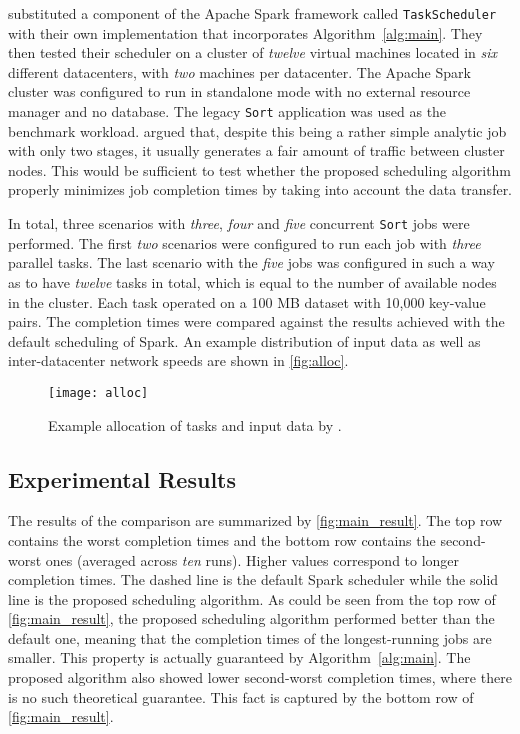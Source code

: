 \citet{Chen2017} substituted a component of the Apache Spark framework called \texttt{TaskScheduler} with their own implementation that incorporates Algorithm~\ref{alg:main}. They then tested their scheduler on a cluster of \emph{twelve} virtual machines located in \emph{six} different datacenters, with \emph{two} machines per datacenter. The Apache Spark cluster was configured to run in standalone mode with no external resource manager and no database. The legacy \texttt{Sort} application was used as the benchmark workload. \citet{Chen2017} argued that, despite this being a rather simple analytic job with only two stages, it usually generates a fair amount of traffic between cluster nodes. This would be sufficient to test whether the proposed scheduling algorithm properly minimizes job completion times by taking into account the data transfer.

In total, three scenarios with \emph{three}, \emph{four} and \emph{five} concurrent \texttt{Sort} jobs were performed. The first \emph{two} scenarios were configured to run each job with \emph{three} parallel tasks. The last scenario with the \emph{five} jobs was configured in such a way as to have \emph{twelve} tasks in total, which is equal to the number of available nodes in the cluster. Each task operated on a 100 MB dataset with 10,000 key-value pairs. The completion times were compared against the results achieved with the default scheduling of Spark. An example distribution of input data as well as inter-datacenter network speeds are shown in \autoref{fig:alloc}.

\begin{figure}
  \centering
  \texttt{[image: alloc]} \\
  \caption{Example allocation of tasks and input data by \citet{Chen2017}.}
  \label{fig:alloc}
\end{figure}


\subsection{Experimental Results}

The results of the comparison are summarized by \autoref{fig:main_result}. The top row contains the worst completion times and the bottom row contains the second-worst ones (averaged across \emph{ten} runs). Higher values correspond to longer completion times. The dashed line is the default Spark scheduler while the solid line is the proposed scheduling algorithm. As could be seen from the top row of \autoref{fig:main_result}, the proposed scheduling algorithm performed better than the default one, meaning that the completion times of the longest-running jobs are smaller. This property is actually guaranteed by Algorithm~\ref{alg:main}. The proposed algorithm also showed lower second-worst completion times, where there is no such theoretical guarantee. This fact is captured by the bottom row of \autoref{fig:main_result}.

